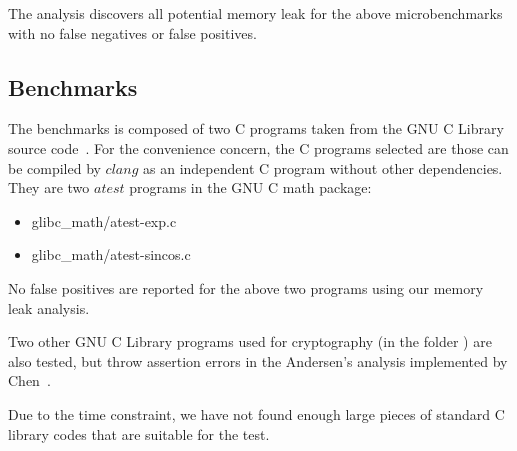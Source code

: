 The analysis discovers all potential memory leak for the above microbenchmarks 
with no false negatives or false positives.


\subsection{Benchmarks}
\label{benchmarks}

The benchmarks is composed of two C programs taken from the GNU C Library 
source code~\cite{glibc}. For the convenience concern, the C programs selected 
are those can be compiled by $clang$ as an independent C program without other
dependencies. They are two $atest$ programs in the GNU C math package:

\begin{itemize}
  \item glibc\_math/atest-exp.c
  \item glibc\_math/atest-sincos.c
\end{itemize}

No false positives are reported for the above two programs using our memory leak 
analysis.

Two other GNU C Library programs used for cryptography (in the folder \crypt) 
are also tested, but throw assertion errors in the Andersen's 
analysis implemented by Chen~\cite{chen}.

Due to the time constraint, we have not found enough large pieces of standard C 
library codes that are suitable for the test.
